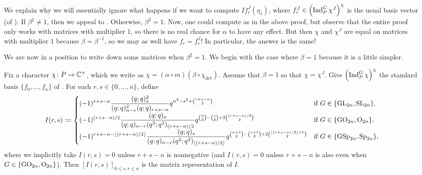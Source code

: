 \begin{remark} \label{rem:i-on-fj}
	We explain why we will essentially ignore what happens if we want to compute $If_r^J(\eta_s)$, where $f_r^J\in\left(\operatorname{Ind}_P^G\chi^J\right)^{\chi}$ is the usual basis vector (of ). If $\beta^2\ne1$, then we appeal to . Otherwise, $\beta^2=1$. Now, one could compute as in the above proof, but observe that the entire proof only works with matrices with multiplier $1$, so there is no real chance for $\alpha$ to have any effect. But then $\chi$ and $\chi^J$ are equal on matrices with multiplier $1$ because $\beta=\beta^{-1}$, so we may as well have $f_r=f_r^J$! In particular, the answer is the same!
\end{remark}
We are now in a position to write down some matrices when $\beta^2=1$. We begin with the case where $\beta=1$ because it is a little simpler.
\begin{proposition} \label{prop:trivial-matrix-coeffs}
	Fix a character $\chi\colon P\to\mathbb C^\times$, which we write as $\chi=(\alpha\circ m)(\beta\circ\chi_{\det})$. Assume that $\beta=1$ so that $\chi=\chi^J$. Give $\left(\operatorname{Ind}_P^G\chi\right)^\chi$ the standard basis $\{f_0,\ldots,f_n\}$ of . For each $r,s\in\{0,\ldots,n\}$, define
	\[I(r,s)\coloneqq\begin{cases}
		\displaystyle(-1)^{r+s-n}\frac{(q;q)_s^2}{(q;q)_{n-r}^2(q;q)_{r+s-n}}q^{n^2-s^2+\binom{r+s-n}2} & \text{if }G\in\{\mathrm{GL}_{2n},\mathrm{SL}_{2n}\}, \\
		\displaystyle(-1)^{(r+s-n)/2}\frac{(q;q)_s}{(q;q)_{n-r}(q^2;q^2)_{(r+s-n)/2}}q^{\binom{n}2-\binom{s}2+2\binom{(r+s-n)/2}2} & \text{if }G\in\{\mathrm{GO}_{2n},\mathrm{O}_{2n}\}, \\
		\displaystyle(-1)^{r+s-n-\left\lfloor{(r+s-n)/2}\right\rfloor}\frac{(q;q)_s}{(q;q)_{n-r}(q^2;q^2)_{\left\lfloor{(r+s-n)/2}\right\rfloor}}q^{\binom{n+1}2-\binom{s+1}2+2\binom{\left\lfloor{(r+s-n)/2}\right\rfloor+1}2} & \text{if }G\in\{\mathrm{GSp}_{2n},\mathrm{Sp}_{2n}\}, \\
	\end{cases}\]
	where we implicitly take $I(r,s)=0$ unless $r+s-n$ is nonnegative (and $I(r,s)=0$ unless $r+s-n$ is also even when $G\in\{\mathrm{GO}_{2n},\mathrm{O}_{2n}\}$). Then $[I(r,s)]_{0\le s,r\le n}$ is the matrix representation of $I$.
\end{proposition}
